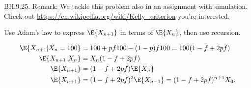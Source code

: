 
\setcounter{theorem}{24}
\begin{exercise} BH.9.25.
Remark:  We tackle this problem also in an assignment with simulation.  Check out \url{https://en.wikipedia.org/wiki/Kelly_criterion} you're interested.
\begin{hint}
Use Adam's law to express $\E{X_{n+1}}$ in terms of $\E{X_{n}}$, then use recursion.
\end{hint}
\begin{solution}
\begin{align*}
  \E{X_{n+1} |X_n=100} &= 100 + pf 100 - (1-p)f 100  = 100(1-f + 2pf) \\
  \E{X_{n+1} |X_n} &= X_{n}( 1- f + 2pf) \\
  \E{X_{n+1} } &= ( 1- f + 2pf) \E{X_{n}} \\
  \E{X_{n+1} } &= ( 1- f + 2pf)^{2} \E{X_{n-1}} =  ( 1- f + 2pf)^{n+1}X_{0}.
\end{align*}
\end{solution}
\end{exercise}

